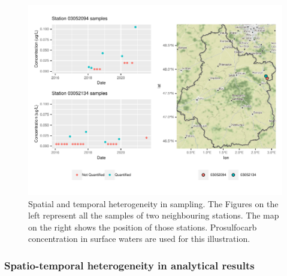 \begin{figure}[htbp]
    \centering
    \includegraphics{figs/Chap3/Hetero_ex.pdf}
    \caption{Spatial and temporal heterogeneity in sampling. The Figures on the left represent all the samples of two neighbouring stations. The map on the right shows the position of those stations. Prosulfocarb concentration in surface waters are used for this illustration.}
    \label{fig:het_samp_ex}
\end{figure}

\subsubsection{Spatio-temporal heterogeneity in analytical results}

